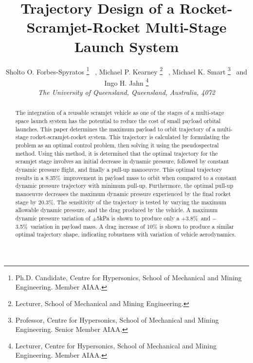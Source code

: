 \documentclass[journal]{new-aiaa}
\newcommand{\PayloadImprovement}{8.35\%}
\newcommand{\qDecrease}{20.3\%}
\newcommand{\qVariationPlus}{$+$3.8\%}
\newcommand{\qVariationMinus}{$-$3.5\%}
\begin{document}

\title{Trajectory Design of a Rocket-Scramjet-Rocket Multi-Stage Launch System} %




 \author{
 	Sholto O. Forbes-Spyratos%
 	\thanks{Ph.D. Candidate, Centre for Hypersonics, School of Mechanical and Mining Engineering. Member AIAA.}
 	\ ,  Michael P. Kearney
 	\thanks{Lecturer, School of Mechanical and Mining Engineering.}
 	\ ,  Michael K. Smart
 	\thanks{Professor, Centre for Hypersonics, School of Mechanical and Mining Engineering. Senior Member AIAA.}
 	\ and   Ingo H. Jahn
 	\thanks{Lecturer, Centre for Hypersonics, School of Mechanical and Mining Engineering. Member AIAA.}
 	\\
 	{\normalsize\itshape
 		The University of Queensland, Queensland, Australia, 4072}\\
 }



\maketitle

\begin{abstract}

The integration of a reusable scramjet vehicle as one of the stages of a multi-stage space launch system has the potential to reduce the cost of small payload orbital launches. 
This paper determines the maximum payload to orbit trajectory of a multi-stage rocket-scramjet-rocket system. This trajectory is calculated by formulating the problem as an optimal control problem, then solving it using the pseudospectral method. 
Using this method, it is determined that the optimal trajectory for the scramjet stage involves an initial decrease in dynamic pressure, followed by constant dynamic pressure flight, and finally a pull-up manoeuvre. This optimal trajectory results in a \PayloadImprovement\ improvement in payload mass to orbit when compared to a constant dynamic pressure trajectory with minimum pull-up. 
Furthermore, the optimal pull-up manoeuvre decreases the maximum dynamic pressure experienced by the final rocket stage by \qDecrease. 
The sensitivity of the trajectory is tested by varying the maximum allowable dynamic pressure, and the drag produced by the vehicle. 
A maximum dynamic pressure variation of $\pm$5kPa is shown to produce only a \qVariationPlus\ and \qVariationMinus\ variation in payload mass. A drag increase of 10\% is shown to produce a similar optimal trajectory shape, indicating robustness with variation of vehicle aerodynamics. 


\end{abstract}
\end{document}
